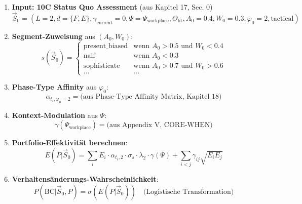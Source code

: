 \begin{enumerate}
\item \textbf{Input: 10C Status Quo Assessment} (aus Kapitel 17, Sec. 0)
\begin{equation}
\vec{S}_0 = (L=2, d=\{F,E\}, \gamma_{\text{current}}=0, \Psi=\Psi_{\text{workplace}}, \Theta_{\text{lit}}, A_0=0.4, W_0=0.3, \varphi_0=2, \text{tactical})
\end{equation}

\item \textbf{Segment-Zuweisung} aus $(A_0, W_0)$:
\begin{equation}
s(\vec{S}_0) = \begin{cases}
\text{present\_biased} & \text{wenn } A_0 > 0.5 \text{ und } W_0 < 0.4 \\
\text{naif} & \text{wenn } A_0 < 0.3 \\
\text{sophisticate} & \text{wenn } A_0 > 0.7 \text{ und } W_0 > 0.6 \\
... & ...
\end{cases}
\end{equation}

\item \textbf{Phase-Type Affinity} aus $\varphi_0$:
\begin{equation}
\alpha_{t_i, \varphi_0=2} = \text{(aus Phase-Type Affinity Matrix, Kapitel 18)}
\end{equation}

\item \textbf{Kontext-Modulation} aus $\Psi$:
\begin{equation}
\gamma(\Psi_{\text{workplace}}) = \text{(aus Appendix V, CORE-WHEN)}
\end{equation}

\item \textbf{Portfolio-Effektivität berechnen}:
\begin{equation}
E(P | \vec{S}_0) = \sum_{i} E_i \cdot \alpha_{t_i, 2} \cdot \sigma_{s} \cdot \lambda_2 \cdot \gamma(\Psi) + \sum_{i<j} \gamma_{ij} \sqrt{E_i E_j}
\end{equation}

\item \textbf{Verhaltensänderungs-Wahrscheinlichkeit}:
\begin{equation}
P(\text{BC} | \vec{S}_0, P) = \sigma(E(P | \vec{S}_0)) \quad \text{(Logistische Transformation)}
\end{equation}
\end{enumerate}

